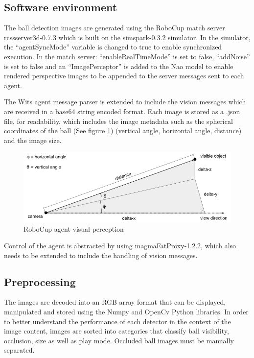 \documentclass[a4paper,twoside,12pt]{report}
\begin{document}
\subsection{Software environment}
The ball detection images are generated using the RoboCup match server rcssserver3d-0.7.3 which is built on the simspark-0.3.2 simulator. In the simulator, the ``agentSyncMode'' variable is changed to true to enable synchronized execution. In the match server: ``enableRealTimeMode'' is set to false, ``addNoise'' is set to false and an ``ImagePerceptor'' is added to the Nao model to enable rendered perspective images to be appended to the server messages sent to each agent.  

The Wits agent message parser is extended to include the vision messages which are received in a base64 string encoded format. Each image is stored as a .json file, for readability, which includes the image metadata such as the spherical coordinates of the ball (See figure \ref{fig:spherical}) (vertical angle, horizontal angle, distance) and the image size. 

\begin{figure}[h!]
\begin{center}
\includegraphics[width=12cm]{images/Vision_Perception.png}
\caption{RoboCup agent visual perception \citep{perceptors}}
\label{fig:spherical}
\end{center}
\end{figure}

Control of the agent is abstracted by using magmaFatProxy-1.2.2, which also needs to be extended to include the handling of vision messages.

\subsection{Preprocessing}

The images are decoded into an RGB array format that can be displayed, manipulated and stored using the Numpy and OpenCv Python libraries. In order to better understand the performance of each detector in the context of the image content, images are sorted into categories that classify ball visibility, occlusion, size as well as play mode. Occluded ball images must be manually separated.
\end{document}
